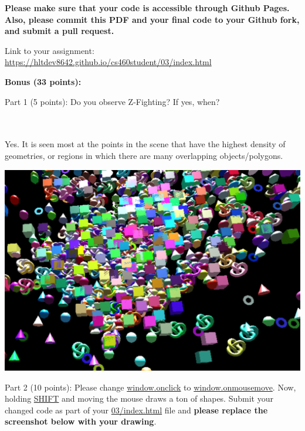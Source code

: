 \documentclass[10pt,oneside,onecolumn,letterpaper]{article}
\begin{document}
\noindent\textbf{Please make sure that your code is accessible through Github Pages. Also, please commit this PDF and your final code to your Github fork, and submit a pull request.}

\vspace{.5cm} %

Link to your assignment: \url{https://hltdev8642.github.io/cs460student/03/index.html}

\clearpage %

\noindent\textbf{Bonus (33 points):}


\vspace{.5cm} %

\noindent Part 1 (5 points): Do you observe Z-Fighting? If yes, when?

\\~\\
Yes.
It is seen most at the points in the scene that have the highest density of geometries, or regions in which there are many overlapping objects/polygons.
\vspace{1cm}


\begin{center}
    \includegraphics[width=1.0\textwidth]{gfx/z-fighting-investigation-image-1.png}
\end{center}

\vspace{3cm}

\clearpage

\noindent Part 2 (10 points): Please change \url{window.onclick} to \url{window.onmousemove}. Now, holding \url{SHIFT} and moving the mouse draws a ton of shapes. Submit your changed code as part of your \url{03/index.html} file and \textbf{please replace the screenshot below with your drawing}.
\end{document}
